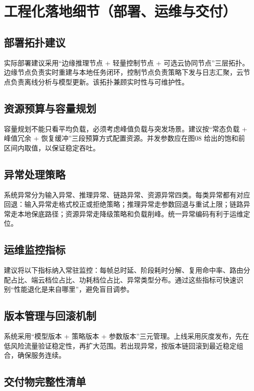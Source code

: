 \documentclass[12pt,a4paper]{ctexart}
\begin{document}
\section{工程化落地细节（部署、运维与交付）}

\subsection{部署拓扑建议}

实际部署建议采用“边缘推理节点 + 轻量控制节点 + 可选云协同节点”三层拓扑。边缘节点负责实时重建与本地任务闭环，控制节点负责策略下发与日志汇聚，云节点负责离线分析与模型更新。该拓扑兼顾实时性与可维护性。

\subsection{资源预算与容量规划}

容量规划不能只看平均负载，必须考虑峰值负载与突发场景。建议按“常态负载 + 峰值冗余 + 恢复缓冲”三段预算方式配置资源。并发参数应在图08 给出的饱和前区间内取值，以保证稳定吞吐。

\subsection{异常处理策略}

系统异常分为输入异常、推理异常、链路异常、资源异常四类。每类异常都有对应回退：输入异常走格式校正或拒绝策略；推理异常走参数回退与重试上限；链路异常走本地保底路径；资源异常走降级策略和负载削峰。统一异常编码有利于运维定位。

\subsection{运维监控指标}

建议将以下指标纳入常驻监控：每帧总时延、阶段耗时分解、复用命中率、路由分配占比、端云档位占比、功耗档位占比、异常类型分布。通过这些指标可快速识别“性能退化是来自哪里”，避免盲目调参。

\subsection{版本管理与回滚机制}

系统采用“模型版本 + 策略版本 + 参数版本”三元管理。上线采用灰度发布，先在低风险流量验证稳定性，再扩大范围。若出现异常，按版本链回滚到最近稳定组合，确保服务连续。

\subsection{交付物完整性清单}
\end{document}
